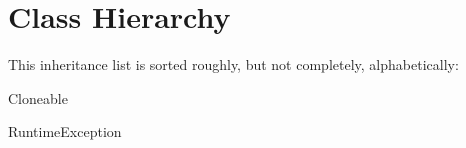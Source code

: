 \section{Class Hierarchy}
This inheritance list is sorted roughly, but not completely, alphabetically\+:\begin{DoxyCompactList}
\item {}
\item Cloneable\begin{DoxyCompactList}
\item {}
\begin{DoxyCompactList}
\item {}
\end{DoxyCompactList}
\end{DoxyCompactList}
\item {}
\item {}
\item Runtime\+Exception\begin{DoxyCompactList}
\item {}
\end{DoxyCompactList}
\item {}
\item {}
\end{DoxyCompactList}
